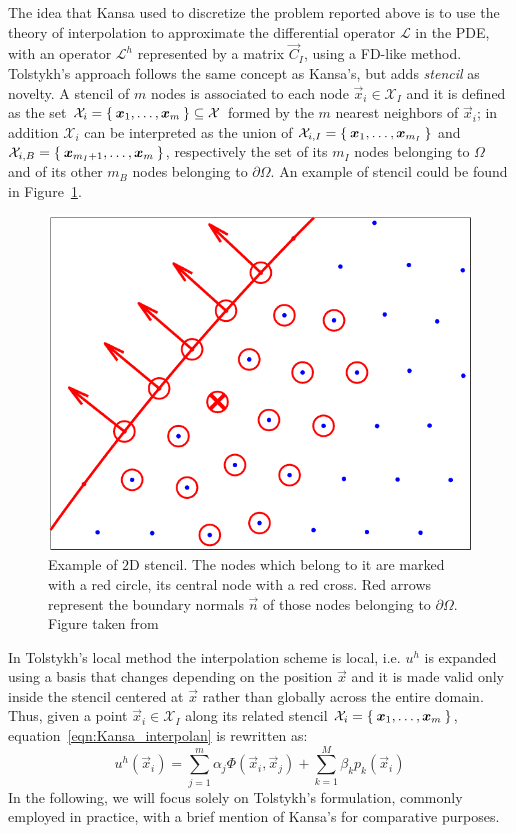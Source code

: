 The idea that Kansa used to discretize the problem reported above is to use the theory of interpolation to approximate the differential operator $\mathcal{L}$ in the PDE, with an operator $\mathcal{L}^h$ represented by a matrix $\vec{C}_I$, using a FD-like method.
Tolstykh's approach follows the same concept as Kansa's, but adds \emph{stencil} as novelty. A stencil of $m$ nodes is associated to each node $\vec{x}_i \in \mathcal{X}_I$ and it is defined as the set $\mathcal{X}_i = \Set{\boldsymbol{x}_1, \dots, \boldsymbol{x}_m} \subseteq \mathcal{X}$ formed by the $m$ nearest neighbors of $\vec{x}_i$; in addition $\mathcal{X}_i$ can be interpreted as the union of $\mathcal{X}_{i,I} = \Set{\boldsymbol{x}_1, \dots, \boldsymbol{x}_{m_I}}$ and $\mathcal{X}_{i,B} = \Set{\boldsymbol{x}_{m_I+1}, \dots, \boldsymbol{x}_m}$, respectively the set of its $m_I$ nodes belonging to $\Omega$ and of its other $m_B$ nodes belonging to $\partial\Omega$. An example of stencil could be found in Figure~\ref{fig:2D_stencil}.

\begin{figure}
\centering
\includegraphics[width=.5\textwidth]{img/2D_stencil}
\caption{Example of $2$D stencil. The nodes which belong to it are marked with a red circle, its central node with a red cross. Red arrows represent the boundary normals $\vec{n}$ of those nodes belonging to $\partial\Omega$. Figure taken from~\cite{Miotti:phd_thesis}} 
\label{fig:2D_stencil}
\end{figure}

In Tolstykh's local method the interpolation scheme is local, i.e. $u^h$ is expanded using a basis that changes depending on the position $\vec{x}$ and it is made valid only inside the stencil centered at $\vec{x}$ rather than globally across the entire domain. Thus, given a point $\vec{x}_i \in \mathcal{X}_I$ along its related stencil $\mathcal{X}_i = \Set{\boldsymbol{x}_1, \dots, \boldsymbol{x}_m}$, equation~\eqref{eqn:Kansa_interpolan} is rewritten as:
\begin{equation}
	\label{eqn:local_RBF-FD_interpolant}
	u^h(\vec{x}_i) = \sum_{j=1}^{m} \alpha_j \Phi(\vec{x}_i, \vec{x}_j) + \sum_{k=1}^{M} \beta_k p_k(\vec{x}_i)
\end{equation}
In the following, we will focus solely on Tolstykh’s formulation, commonly employed in practice, with a brief mention of Kansa's for comparative purposes.


